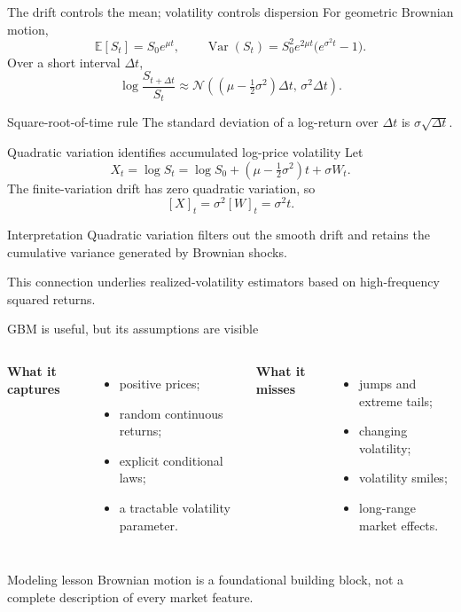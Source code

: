 \documentclass[10pt,aspectratio=169]{beamer}
\newcommand{\E}{\mathbb E}
\begin{document}
\begin{frame}{The drift controls the mean; volatility controls dispersion}
For geometric Brownian motion,
\[
\E[S_t]=S_0e^{\mu t},
\qquad
\operatorname{Var}(S_t)
=S_0^2e^{2\mu t}\bigl(e^{\sigma^2t}-1\bigr).
\]
Over a short interval \(\Delta t\),
\[
\log\frac{S_{t+\Delta t}}{S_t}
\approx\mathcal N\!\left(
\left(\mu-\tfrac12\sigma^2\right)\Delta t,\,
\sigma^2\Delta t
\right).
\]
\begin{block}{Square-root-of-time rule}
The standard deviation of a log-return over \(\Delta t\) is \(\sigma\sqrt{\Delta t}\).
\end{block}
\end{frame}

\begin{frame}{Quadratic variation identifies accumulated log-price volatility}
Let
\[
X_t=\log S_t
=\log S_0+\left(\mu-\tfrac12\sigma^2\right)t+\sigma W_t.
\]
The finite-variation drift has zero quadratic variation, so
\[
\boxed{[X]_t=\sigma^2[W]_t=\sigma^2t.}
\]
\begin{block}{Interpretation}
Quadratic variation filters out the smooth drift and retains the cumulative variance generated by Brownian shocks.
\end{block}
This connection underlies realized-volatility estimators based on high-frequency squared returns.
\end{frame}

\begin{frame}{GBM is useful, but its assumptions are visible}
\begin{columns}[T,onlytextwidth]
\textbf{What it captures}
\begin{itemize}
  \item positive prices;
  \item random continuous returns;
  \item explicit conditional laws;
  \item a tractable volatility parameter.
\end{itemize}
\textbf{What it misses}
\begin{itemize}
  \item jumps and extreme tails;
  \item changing volatility;
  \item volatility smiles;
  \item long-range market effects.
\end{itemize}
\end{columns}
\begin{block}{Modeling lesson}
Brownian motion is a foundational building block, not a complete description of every market feature.
\end{block}
\end{frame}
\end{document}
